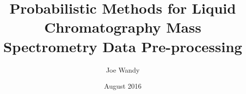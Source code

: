 \documentclass[twoside]{glasgowthesis}
\begin{document}
\pagestyle{empty}

\title{Probabilistic Methods for Liquid Chromatography Mass Spectrometry Data Pre-processing}
\author{Joe Wandy}
\date{August 2016}

\maketitle

\newpage

 

\newpage
 









\tableofcontents
\listoftables
\listoffigures

\newpage
\pagestyle{fancy}
\setcounter{page}{1}
\end{document}
